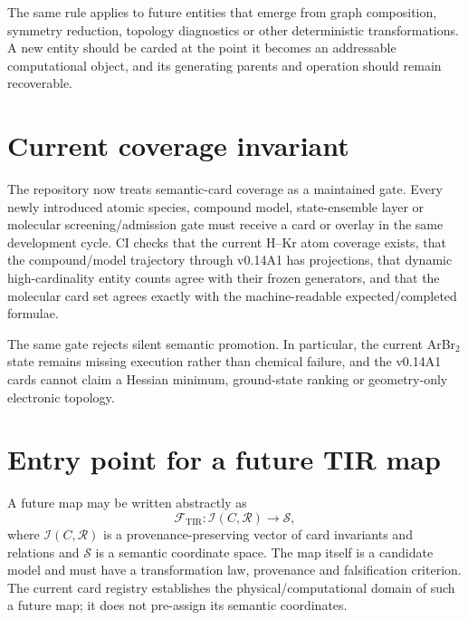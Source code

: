 The same rule applies to future entities that emerge from graph composition, symmetry reduction, topology diagnostics or other deterministic transformations.  A new entity should be carded at the point it becomes an addressable computational object, and its generating parents and operation should remain recoverable.

\section{Current coverage invariant}
The repository now treats semantic-card coverage as a maintained gate.  Every newly introduced atomic species, compound model, state-ensemble layer or molecular screening/admission gate must receive a card or overlay in the same development cycle.  CI checks that the current H--Kr atom coverage exists, that the compound/model trajectory through v0.14A1 has projections, that dynamic high-cardinality entity counts agree with their frozen generators, and that the molecular card set agrees exactly with the machine-readable expected/completed formulae.

The same gate rejects silent semantic promotion.  In particular, the current ArBr$_2$ state remains missing execution rather than chemical failure, and the v0.14A1 cards cannot claim a Hessian minimum, ground-state ranking or geometry-only electronic topology.

\section{Entry point for a future TIR map}
A future map may be written abstractly as
\begin{equation}
\mathcal F_{\mathrm{TIR}}:\mathcal I(C,\mathcal R)\longrightarrow\mathcal S,
\end{equation}
where $\mathcal I(C,\mathcal R)$ is a provenance-preserving vector of card invariants and relations and $\mathcal S$ is a semantic coordinate space. The map itself is a candidate model and must have a transformation law, provenance and falsification criterion. The current card registry establishes the physical/computational domain of such a future map; it does not pre-assign its semantic coordinates.
